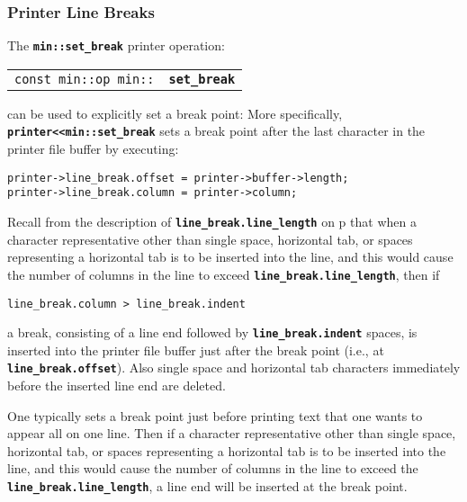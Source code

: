 \documentclass[12pt]{article}
\makeatletter
\newcommand{\TT}[1]{{\tt \bfseries #1}}
\newcommand{\ttindex}[1]{\index{#1@{\tt #1}}}
\newcommand{\pagref}[1]{p\pageref{#1}}
\newcommand{\EOL}{\penalty \exhyphenpenalty}
\newenvironment{indpar}[1][0.3in]%
	{\begin{list}{}%
		     {\setlength{\itemsep}{0in}%
		      \setlength{\topsep}{0in}%
		      \setlength{\parsep}{1ex}%
		      \setlength{\labelwidth}{#1}%
		      \setlength{\leftmargin}{#1}%
		      \addtolength{\leftmargin}{\labelsep}}%
	 \item}%
	{\end{list}}
\newcommand{\LABEL}[1]{\label{#1}}
\newcommand{\MINKEY}[1]%
	   {\TT{#1}\ttindex{min::#1}\ttindex{#1}}
\makeatother
\begin{document}
\subsubsection{Printer Line Breaks}
\label{PRINTER-LINE-BREAKS}

The \TT{min::set\_\EOL break} printer operation:

\begin{indpar}[1em]\begin{tabular}{r@{}l}
\verb|const min::op min::| & \MINKEY{set\_\EOL break}
\LABEL{MIN::SET_BREAK} \\
\end{tabular}\end{indpar}

can be used to explicitly set a break point:
More specifically, \TT{printer<{}<min::set\_\EOL break} sets a break point after
the last character in the printer file buffer by executing:
\begin{indpar}\begin{verbatim}
printer->line_break.offset = printer->buffer->length;
printer->line_break.column = printer->column;
\end{verbatim}\end{indpar}

Recall from the description of \TT{line\_\EOL break.line\_\EOL length} on
\pagref{LINE-LENGTH}
that when a character representative other than single space, horizontal
tab, or spaces representing a horizontal tab
is to be inserted into the line, and this would cause the number
of columns in the line to exceed \TT{line\_\EOL break.line\_\EOL length},
then if
\begin{center}
\tt line\_break.column > line\_break.indent
\end{center}
a break, consisting of a line end followed by \TT{line\_\EOL break.indent}
spaces,
is inserted into the printer file buffer just after the break point
(i.e., at \TT{line\_\EOL break.offset}).  Also
single space and horizontal tab
characters immediately before the inserted line end are deleted.

One typically sets a break point just before printing text that one wants
to appear all on one line.  Then if
a character representative other than single space, horizontal
tab, or spaces representing a horizontal tab
is to be inserted into the line, and this would cause the number
of columns in the line to exceed the \TT{line\_\EOL break.line\_\EOL length},
a line end will be inserted at the break point.
\end{document}
